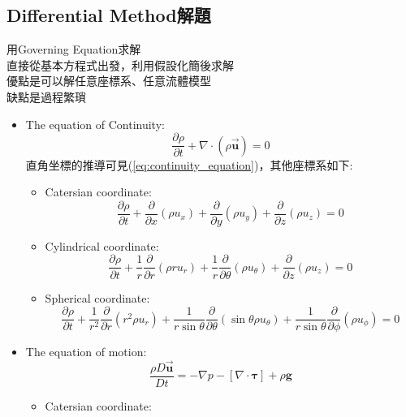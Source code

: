 \documentclass[../main.tex]{subfiles}
\begin{document}
\subsection{Differential Method解題}
用Governing Equation求解\\
直接從基本方程式出發，利用假設化簡後求解\\
優點是可以解任意座標系、任意流體模型\\
缺點是過程繁瑣
\begin{itemize}
  \item The equation of Continuity:
    \begin{equation}
      \frac{\partial \rho}{\partial t} + \nabla \cdot (\rho \vec {\bm u}) = 0
    \end{equation}
    直角坐標的推導可見(\ref{eq:continuity_equation})，其他座標系如下:
    \begin{itemize}
      \item Catersian coordinate:
      \begin{equation}
        \frac{\partial \rho}{\partial t} + \frac{\partial}{\partial x}(\rho u_x) + \frac{\partial}{\partial y}(\rho u_y) + \frac{\partial}{\partial z}(\rho u_z) = 0
      \end{equation}
      \item Cylindrical coordinate:
      \begin{equation}
        \frac{\partial \rho}{\partial t} + \frac{1}{r}\frac{\partial}{\partial r}(\rho r u_r) + 
        \frac{1}{r}\frac{\partial}{\partial \theta}(\rho u_{\theta}) + 
        \frac{\partial}{\partial z}(\rho u_z) = 0
      \end{equation}
      \item Spherical coordinate:
      \begin{equation}
        \frac{\partial \rho}{\partial t} + \frac{1}{r^2}\frac{\partial}{\partial r}(r^2 \rho u_r) + 
        \frac{1}{r\sin\theta}\frac{\partial}{\partial \theta}(\sin\theta \rho u_{\theta}) + 
        \frac{1}{r\sin\theta}\frac{\partial}{\partial \phi}(\rho u_{\phi}) = 0
      \end{equation}
    \end{itemize}
  \item The equation of motion:
    \begin{equation}
      \frac{\rho D\vec {\bm u}}{Dt} = -\nabla p -\left[\nabla \cdot \mathbf \tau\right] + \rho \mathbf g
    \end{equation}
  \begin{itemize}
    \item Catersian coordinate:

\end{itemize}
\end{itemize}
\end{document}
